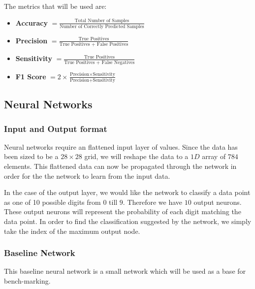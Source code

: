 \documentclass[a4paper,twoside,10pt]{article}
\begin{document}
The metrics that will be used are:
\begin{itemize}
    \item \textbf{Accuracy } $=\frac{\text{Total Number of Samples}}{\text{Number of Correctly Predicted Samples}}$
    \item \textbf{Precision } $= \frac{\text{True Positives}}{\text{True Positives + False Positives}}$
    \item \textbf{Sensitivity } $= \frac{\text{True Positives}}{\text{True Positives + False Negatives}}$
    \item \textbf{F1 Score } $= 2 \times \frac{\text{Precision} \times \text{Sensitivity}}{\text{Precision} + \text{Sensitivity}}$
\end{itemize}



\subsection{Neural Networks}
\subsubsection{Input and Output format}
Neural networks require an flattened input layer of values. Since the data has been sized to be a $28 \times 28$ grid, we will reshape the data to a $1D$ array of $784$ elements. This flattened data can now be propagated through the network in order for the the network to learn from the input data.

In the case of the output layer, we would like the network to classify a data point as one of 10 possible digits from $0$ till $9$. Therefore we have $10$ output neurons. These output neurons will represent the probability of each digit matching the data point. In order to find the classification suggested by the network, we simply take the index of the maximum output node. 

\subsubsection{Baseline Network}
This baseline neural network is a small network which will be used as a base for bench-marking.
\end{document}
